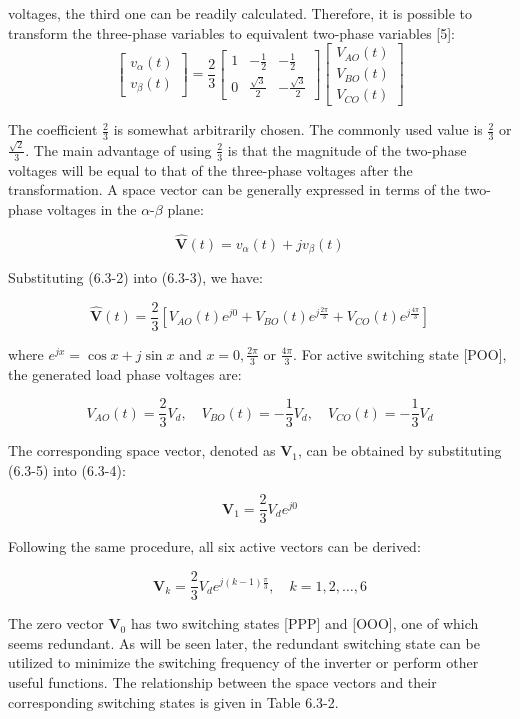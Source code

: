 \documentclass[letterpaper,12pt]{article}
\begin{document}
voltages, the third one can be readily calculated. Therefore, it is possible to transform the three-phase variables to equivalent two-phase variables [5]:
\[
\begin{bmatrix}
v_{\alpha}(t) \\
v_{\beta}(t)
\end{bmatrix}
= \frac{2}{3}
\begin{bmatrix}
1 & -\frac{1}{2} & -\frac{1}{2} \\
0 & \frac{\sqrt{3}}{2} & -\frac{\sqrt{3}}{2}
\end{bmatrix}
\begin{bmatrix}
V_{AO}(t) \\
V_{BO}(t) \\
V_{CO}(t)
\end{bmatrix}
\]

The coefficient $\frac{2}{3}$ is somewhat arbitrarily chosen. The commonly used value is $\frac{2}{3}$ or $\frac{\sqrt{2}}{3}$. The main advantage of using $\frac{2}{3}$ is that the magnitude of the two-phase voltages will be equal to that of the three-phase voltages after the transformation. A space vector can be generally expressed in terms of the two-phase voltages in the $\alpha$-$\beta$ plane:

\[
\mathbf{\hat{V}}(t) = v_{\alpha}(t) + jv_{\beta}(t)
\]

Substituting (6.3-2) into (6.3-3), we have:

\[
\mathbf{\hat{V}}(t) = \frac{2}{3} [V_{AO}(t)e^{j0} + V_{BO}(t)e^{j\frac{2\pi}{3}} + V_{CO}(t)e^{j\frac{4\pi}{3}}]
\]

where $e^{jx} = \cos x + j\sin x$ and $x = 0, \frac{2\pi}{3}$ or $\frac{4\pi}{3}$. For active switching state [POO], the generated load phase voltages are:

\[
V_{AO}(t) = \frac{2}{3} V_d, \quad V_{BO}(t) = -\frac{1}{3} V_d, \quad V_{CO}(t) = -\frac{1}{3} V_d
\]

The corresponding space vector, denoted as $\mathbf{V}_1$, can be obtained by substituting (6.3-5) into (6.3-4):

\[
\mathbf{V}_1 = \frac{2}{3} V_d e^{j0}
\]

Following the same procedure, all six active vectors can be derived:

\[
\mathbf{V}_k = \frac{2}{3} V_d e^{j\left(k-1\right) \frac{\pi}{3}}, \quad k = 1, 2, \ldots, 6
\]

The zero vector $\mathbf{V}_0$ has two switching states [PPP] and [OOO], one of which seems redundant. As will be seen later, the redundant switching state can be utilized to minimize the switching frequency of the inverter or perform other useful functions. The relationship between the space vectors and their corresponding switching states is given in Table 6.3-2.
\end{document}
